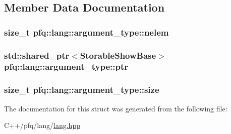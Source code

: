\subsection{Member Data Documentation}
\hypertarget{structpfq_1_1lang_1_1argument__type_ac0016fd1fba8c2cb6922093a9561473f}{
\subsubsection[{nelem}]{\setlength{\rightskip}{0pt plus 5cm}size\+\_\+t pfq\+::lang\+::argument\+\_\+type\+::nelem}}\label{structpfq_1_1lang_1_1argument__type_ac0016fd1fba8c2cb6922093a9561473f}
\hypertarget{structpfq_1_1lang_1_1argument__type_a5b291ef1d2a04a9e238ad29643a77830}{
\subsubsection[{ptr}]{\setlength{\rightskip}{0pt plus 5cm}std\+::shared\+\_\+ptr$<$Storable\+Show\+Base$>$ pfq\+::lang\+::argument\+\_\+type\+::ptr}}\label{structpfq_1_1lang_1_1argument__type_a5b291ef1d2a04a9e238ad29643a77830}
\hypertarget{structpfq_1_1lang_1_1argument__type_ae5d502317434728683578c32b6056275}{
\subsubsection[{size}]{\setlength{\rightskip}{0pt plus 5cm}size\+\_\+t pfq\+::lang\+::argument\+\_\+type\+::size}}\label{structpfq_1_1lang_1_1argument__type_ae5d502317434728683578c32b6056275}


The documentation for this struct was generated from the following file\+:\begin{DoxyCompactItemize}
\item 
C++/pfq/lang/\hyperlink{lang_8hpp}{lang.\+hpp}\end{DoxyCompactItemize}
